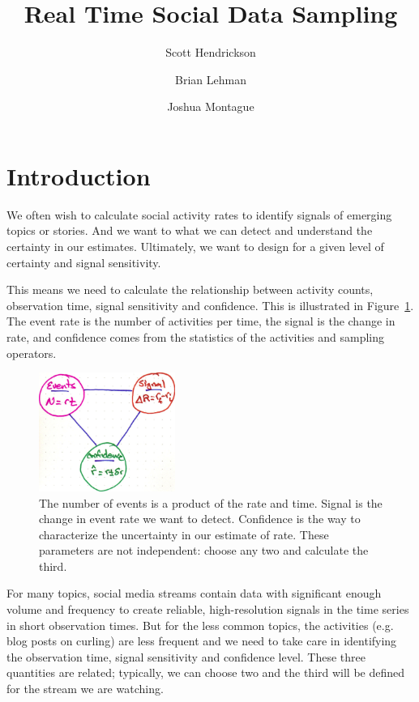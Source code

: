 \documentclass{article}
\title{Real Time Social Data Sampling }
\author[]{Scott Hendrickson}
\author[]{Brian Lehman}
\author[]{Joshua Montague}
\affil[]{ \Large{Gnip, Inc.} }
\begin{document}
\maketitle

\section{Introduction}

We often wish to calculate social activity rates to identify signals of emerging topics or stories.
And we want to what we can detect and understand the certainty in our estimates.  Ultimately, we want to design for a given level of certainty and signal sensitivity.

This means we need to calculate the relationship between activity counts, observation time, signal sensitivity and confidence. This is illustrated in Figure~\ref{fig:tradeoff}. The event rate is the number of activities per time, the signal is the change in rate, and confidence comes from the statistics of the activities and sampling operators.

%
\begin{figure}[h]
	\begin{center}
		\includegraphics[width=1.75in]{./imgs/tradeoff.jpg}
	\end{center}
	\caption{The number of events is a product of the rate and time. Signal is the change in event rate we want to detect.  Confidence is the way to characterize the uncertainty in our estimate of rate. These parameters are not independent: choose any two and calculate the third. }
    	\label{fig:tradeoff}
\end{figure}
%
%

For many topics, social media streams contain data with significant enough volume and frequency to create reliable, high-resolution signals in the time series in short observation times.  But for the less common topics, the activities (e.g. blog posts on curling) are less frequent and we need to take care in identifying the observation time, signal sensitivity and confidence level. These three quantities are related; typically, we can choose two and the third will be defined for the stream we are watching.
\end{document}
